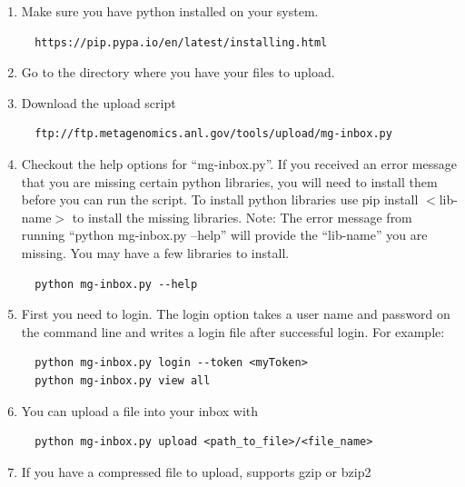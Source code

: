 \documentclass[12pt,fullpage]{report}
\begin{document}
\begin{enumerate}
\item Make sure you have python installed on your system.
\begin{small}
\begin{lstlisting}
  https://pip.pypa.io/en/latest/installing.html
\end{lstlisting}
\end{small}
\item Go to the directory where you have your files to upload.
\item Download the upload script
\begin{small}
\begin{lstlisting}
  ftp://ftp.metagenomics.anl.gov/tools/upload/mg-inbox.py
\end{lstlisting}
\end{small}
\item Checkout the help options for “mg-inbox.py”. If you received an error message that you are missing certain python libraries, you will need to install them before you can run the script. To install python libraries use pip install $<$lib-name$>$ to install the missing libraries.
Note: The error message from running “python mg-inbox.py --help” will provide the “lib-name” you are missing. You may have a few libraries to install.
\begin{small}
\begin{lstlisting}
  python mg-inbox.py --help
\end{lstlisting}
\end{small}
\item First you need to login. The login option takes a user name and password on the command line and writes a login file after successful login. For example:
\begin{small}
\begin{lstlisting}
  python mg-inbox.py login --token <myToken>
  python mg-inbox.py view all
\end{lstlisting}
\end{small}
\item You can upload a file into your inbox with
\begin{small}
\begin{lstlisting}
  python mg-inbox.py upload <path_to_file>/<file_name>
\end{lstlisting}
\end{small}
\item If you have a compressed file to upload, supports gzip or bzip2
\begin{small}

\end{small}
\end{enumerate}
\end{document}
